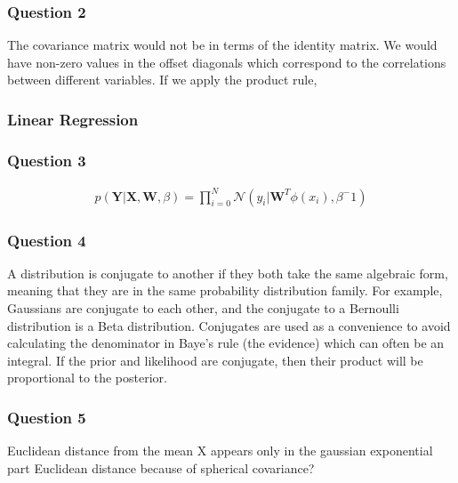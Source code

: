 \documentclass[10pt, a4paper, twocolumn]{article} %
\begin{document}

\subsubsection*{Question 2}
The covariance matrix would not be in terms of the identity matrix. We would have non-zero values in the offset diagonals which correspond to the correlations between different variables. If we apply the product rule, 

\subsubsection{Linear Regression}

\subsubsection*{Question 3}

\begin{align}
  p(\mathbf{Y} | \mathbf{X}, \mathbf{W}, \beta) = \prod_{i=0}^N \mathcal{N} (y_i | \mathbf{W}^T\phi(x_i), \beta^-1)
\end{align}

\subsubsection*{Question 4}

A distribution is conjugate to another if they both take the same algebraic form, meaning that they are in the same probability distribution family. For example, Gaussians are conjugate to each other, and the conjugate to a Bernoulli distribution is a Beta distribution. Conjugates are used as a convenience to avoid calculating the denominator in Baye's rule (the evidence) which can often be an integral. If the prior and likelihood are conjugate, then their product will be proportional to the posterior.


\subsubsection*{Question 5}

Euclidean distance from the mean
X appears only in the gaussian exponential part
Euclidean distance because of spherical covariance? 
\end{document}
